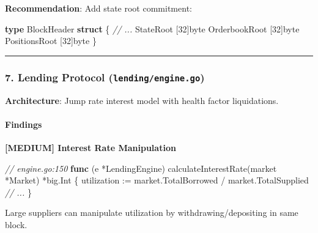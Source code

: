 \documentclass[
]{article}
\newenvironment{Shaded}{}{}
\newcommand{\CommentTok}[1]{\textcolor[rgb]{0.38,0.63,0.69}{\textit{#1}}}
\newcommand{\DataTypeTok}[1]{\textcolor[rgb]{0.56,0.13,0.00}{#1}}
\newcommand{\DecValTok}[1]{\textcolor[rgb]{0.25,0.63,0.44}{#1}}
\newcommand{\KeywordTok}[1]{\textcolor[rgb]{0.00,0.44,0.13}{\textbf{#1}}}
\newcommand{\NormalTok}[1]{#1}
\newcommand{\OperatorTok}[1]{\textcolor[rgb]{0.40,0.40,0.40}{#1}}
\begin{document}
\textbf{Recommendation}: Add state root commitment:

\begin{Shaded}
\begin{Highlighting}[]
\KeywordTok{type}\NormalTok{ BlockHeader }\KeywordTok{struct} \OperatorTok{\{}
    \CommentTok{// ...}
\NormalTok{    StateRoot }\OperatorTok{[}\DecValTok{32}\OperatorTok{]}\DataTypeTok{byte}
\NormalTok{    OrderbookRoot }\OperatorTok{[}\DecValTok{32}\OperatorTok{]}\DataTypeTok{byte}
\NormalTok{    PositionsRoot }\OperatorTok{[}\DecValTok{32}\OperatorTok{]}\DataTypeTok{byte}
\OperatorTok{\}}
\end{Highlighting}
\end{Shaded}

\begin{center}\rule{0.5\linewidth}{0.5pt}\end{center}

\subsubsection{\texorpdfstring{7. Lending Protocol
(\texttt{lending/engine.go})}{7. Lending Protocol (lending/engine.go)}}\label{7-lending-protocol-lendingenginego}

\textbf{Architecture}: Jump rate interest model with health factor
liquidations.

\paragraph{Findings}\label{findings-6}

\textbf{{[}MEDIUM{]} Interest Rate Manipulation}

\begin{Shaded}
\begin{Highlighting}[]
\CommentTok{// engine.go:150}
\KeywordTok{func} \OperatorTok{(}\NormalTok{e }\OperatorTok{*}\NormalTok{LendingEngine}\OperatorTok{)}\NormalTok{ calculateInterestRate}\OperatorTok{(}\NormalTok{market }\OperatorTok{*}\NormalTok{Market}\OperatorTok{)} \OperatorTok{*}\NormalTok{big}\OperatorTok{.}\NormalTok{Int }\OperatorTok{\{}
\NormalTok{    utilization }\OperatorTok{:=}\NormalTok{ market}\OperatorTok{.}\NormalTok{TotalBorrowed }\OperatorTok{/}\NormalTok{ market}\OperatorTok{.}\NormalTok{TotalSupplied}
    \CommentTok{// ...}
\OperatorTok{\}}
\end{Highlighting}
\end{Shaded}

Large suppliers can manipulate utilization by withdrawing/depositing in
same block.
\end{document}
